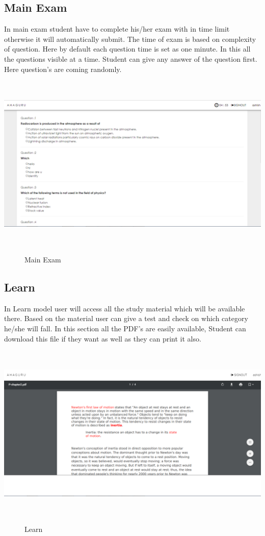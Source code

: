 \subsection{Main Exam}
In main exam student have to complete his/her exam with in time limit otherwise it will automatically submit. The time of exam is based on complexity of question. Here by default each question time is set as one minute. In this all the questions visible at a time. Student can give any answer of the question first. Here question's are coming randomly. 
\begin{center}
	\includegraphics[width=13.5cm, height=8.5cm]{main_exam.png}
	\begin{figure}[h!]
		\centering
		\caption{Main Exam}%
	\end{figure}
\end{center}\break
\subsection{Learn}
In Learn model user will access all the study material which will be available there. Based on the material user can give a test and check on which category he/she will fall. In this section all the PDF's are easily available, Student can download this file if they want as well as they can print it also. 
\begin{center}
	\includegraphics[width=13.5cm,
	 height=8.5cm]{learn.png}
	\begin{figure}[h!]
		\centering
		\caption{Learn}%
	\end{figure}
\end{center}\break
